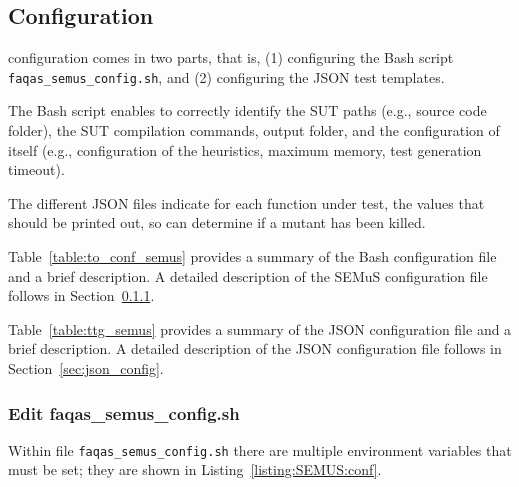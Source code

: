 \subsection{\SEMUS Configuration}

\SEMUS configuration comes in two parts, that is, (1) configuring the Bash script \texttt{faqas\_semus\_config.sh}, and (2) configuring the JSON test templates.


The Bash script enables \SEMUS to correctly identify the SUT paths (e.g., source code folder), the SUT compilation commands, output folder, and the configuration of \SEMUS itself (e.g., configuration of the heuristics, maximum memory, test generation timeout).

The different JSON files indicate for each function under test, the values that should be printed out, so \SEMUS can determine if a mutant has been killed.



Table~\ref{table:to_conf_semus} provides a summary of the Bash \SEMUS configuration file and a brief description. A detailed description of the SEMuS configuration file follows in Section~\ref{sec:semus_config}.



Table~\ref{table:ttg_semus} provides a summary of the JSON \SEMUS configuration file and a brief description. A detailed description of the JSON configuration file follows in Section~\ref{sec:json_config}.


\subsubsection{Edit faqas\_semus\_config.sh}
\label{sec:semus_config}

Within file \texttt{faqas\_semus\_config.sh} there are multiple environment variables that must be set; they are shown in Listing~\ref{listing:SEMUS:conf}.


